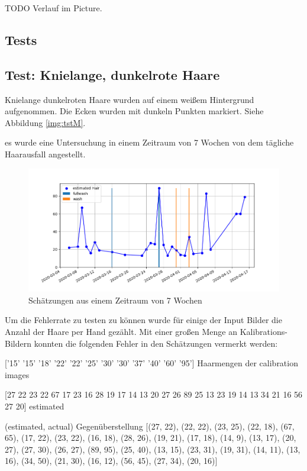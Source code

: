 \documentclass[german,a4paper, 12pt]{llncs}
\begin{document}
TODO Verlauf im Picture.

\subsection{Tests}
\subsection{Test: Knielange, dunkelrote Haare}

Knielange dunkelroten Haare wurden auf einem weißem Hintergrund aufgenommen. Die Ecken wurden mit dunkeln Punkten markiert. Siehe Abbildung \ref{img:tstM}.



es wurde eine Untersuchung in einem Zeitraum von 7 Wochen von dem tägliche Haarausfall angestellt. 
\begin{figure}
	\centering
	\includegraphics[width=1.0\textwidth]{fig64/plot.png}
	\caption[]{Schätzungen aus einem Zeitraum von 7 Wochen}
	\label{img:7weeks}
\end{figure} 

Um die Fehlerrate zu testen zu können wurde für einige der Input Bilder die Anzahl der Haare per Hand gezählt.
Mit einer großen Menge an Kalibrations-Bildern konnten die folgenden Fehler in den Schätzungen vermerkt werden:
 
['15' '15' '18' '22' '22' '25' '30' '30' '37' '40' '60' '95'] Haarmengen der calibration images

[27 22 23 22 67 17 23 16 28 19 17 14 13 20 27 26 89 25 13 23 19 14 13 34 
21 16 56 27 20] estimated

(estimated, actual) Gegenüberstellung
[(27, 22), (22, 22), (23, 25), (22, 18), (67, 65), (17, 22), (23, 22), (16, 18), (28, 26), (19, 21), (17, 18), (14, 9), (13, 17), (20, 27), (27, 30), (26, 27), (89, 95), (25, 40), (13, 15), (23, 31), (19, 31), (14, 11), (13, 16), (34, 50), (21, 30), (16, 12), (56, 45), (27, 34), (20, 16)]
\end{document}
